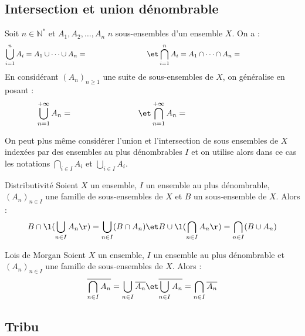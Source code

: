 \documentclass[a4paper,10pt]{report}
\begin{document}
\begin{itemize}
\subsection{Intersection et union dénombrable}

Soit $n \in \mathbb{N}^*$ et $A_1, A_2, \ldots, A_n$ $n$ sous-ensembles d'un ensemble $X$. On a :
$$ \bigcup_{i=1}^n A_i = A_1 \cup \cdots \cup A_n =  \qquad \qquad \qquad \qquad \et \bigcap_{i=1}^n A_i = A_1 \cap \cdots \cap A_n =\qquad \qquad \qquad \qquad$$
En considérant $(A_n)_{n \geq 1}$ une suite de sous-ensembles de $X$, on généralise en posant :
$$ \bigcup_{n=1}^{+ \infty} A_n =  \qquad \qquad \qquad \qquad \et \bigcap_{n=1}^{+ \infty} A_n  =\qquad \qquad \qquad  \qquad\qquad$$

On peut plus même considérer l'union et l'intersection de sous ensembles de $X$ indexées par des ensembles au plus dénombrables $I$ et on utilise alors dans ce cas les notations $\bigcap_{i \in I} A_i$ et $\bigcup_{i \in I} A_i$.

\begin{Proposition}{Distributivité}
Soient  $X$ un ensemble, $I$ un ensemble au plus dénombrable, $(A_n)_{n\in I}$ une famille de sous-ensembles de $X$ et $B$ un sous-ensemble de $X$. Alors :
 $$ B \cap \l(\bigcup_{n\in I} A_n \r) = \bigcup_{n\in I} (B \cap A_n) \et  B \cup \l(\bigcap_{n\in I} A_n \r) = \bigcap_{n\in I} (B \cup A_n) $$
\end{Proposition}


\begin{Theoreme}{Lois de Morgan}
 Soient $X$ un ensemble, $I$ un ensemble au plus dénombrable et $(A_n)_{n\in I}$ une famille de sous-ensembles de $X$. Alors :
 $$ \overline{\bigcap_{n\in I} A_n} = \bigcup_{n\in I} \overline{A_n} \et \overline{\bigcup_{n\in I} A_n} = \bigcap_{n\in I} \overline{A_n}$$
\end{Theoreme}


\subsection{Tribu}


\end{itemize}
\end{document}

